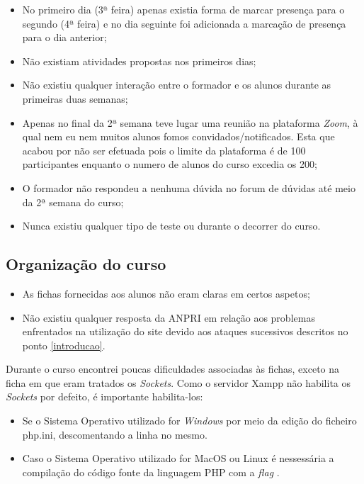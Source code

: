 \documentclass[14pt]{article}
\begin{document}
\begin{itemize}
  \item No primeiro dia (3ª feira) apenas existia forma de marcar presença para o segundo (4ª feira) e no dia seguinte foi adicionada a marcação de presença para o dia anterior;
  \item Não existiam atividades propostas nos primeiros dias;
  \item Não existiu qualquer interação entre o formador e os alunos durante as primeiras duas semanas;
  \item Apenas no final da 2ª semana teve lugar uma reunião na plataforma \textit{Zoom}, à qual nem eu nem muitos alunos fomos convidados/notificados. Esta que acabou por não ser efetuada pois o limite da plataforma é de 100 participantes enquanto o numero de alunos do curso excedia os 200;
  \item O formador não respondeu a nenhuma dúvida no forum de dúvidas até meio da 2ª semana do curso;
  \item Nunca existiu qualquer tipo de teste ou  durante o decorrer do curso.
\end{itemize}
\newline
\subsection{Organização do curso}
\begin{itemize}
  \item As fichas fornecidas aos alunos não eram claras em certos aspetos;
  \item Não existiu qualquer resposta da ANPRI em relação aos problemas enfrentados na utilização do site devido aos ataques sucessivos descritos no ponto \large\ref{introducao}.
\end{itemize}
\newpage
Durante o curso encontrei poucas dificuldades associadas às fichas, exceto na ficha em que eram tratados os \textit{Sockets}.
Como o servidor Xampp não habilita os \textit{Sockets} por defeito, é importante habilita-los:
\begin{itemize}
  \item Se o Sistema Operativo utilizado for \textit{Windows} por meio da edição do ficheiro php.ini, descomentando a linha \textit{}  no mesmo.
  \item Caso o Sistema Operativo utilizado for MacOS ou Linux é nessessária a compilação do código fonte da linguagem PHP com a \textit{flag} \textit{}.
\end{itemize}
\end{document}
